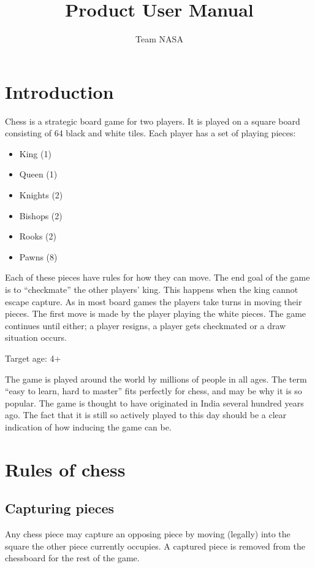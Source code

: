 \documentclass[12pt, a4paper]{article}
\title{Product User Manual}
\author{Team NASA}
\date{}
\begin{document}
\maketitle

\tableofcontents
\pagebreak

\section{Introduction}
Chess is a strategic board game for two players. It is played on a square board consisting of 64 black and white tiles. Each player has a set of playing pieces:
\begin{itemize}
\item King (1)
\item Queen (1)
\item Knights (2)
\item Bishops (2)
\item Rooks (2)
\item Pawns (8)
\end{itemize}

Each of these pieces have rules for how they can move. The end goal of the game is to “checkmate” the other players’ king. This happens when the king cannot escape capture. As in most board games the players take turns in moving their pieces. The first move is made by the player playing the white pieces. The game continues until either; a player resigns, a player gets checkmated or a draw situation occurs.

Target age: 4+

The game is played around the world by millions of people in all ages. The term “easy to learn, hard to master” fits perfectly for chess, and may be why it is so popular. The game is thought to have originated in India several hundred years ago. The fact that it is still so actively played to this day should be a clear indication of how inducing the game can be.

\section{Rules of chess}

\subsection{Capturing pieces}
Any chess piece may capture an opposing piece by moving (legally) into the square the other piece currently occupies. A captured piece is removed from the chessboard for the rest of the game.
\end{document}
